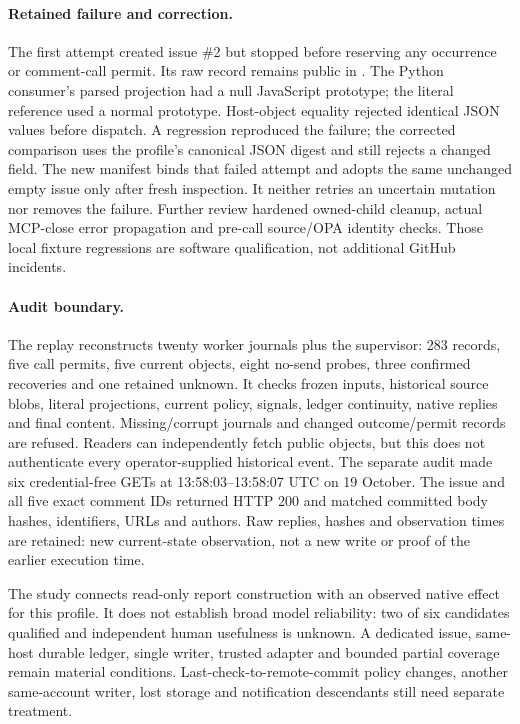 \documentclass[11pt,letterpaper]{article}
\begin{document}
\paragraph{Retained failure and correction.}
The first attempt created issue \#2 but stopped before reserving any occurrence
or comment-call permit. Its raw record remains public in
. The Python consumer's
parsed projection had a null JavaScript prototype; the literal reference used
a normal prototype. Host-object equality rejected identical JSON values before
dispatch. A regression reproduced the failure; the corrected comparison uses
the profile's canonical JSON digest and still rejects a changed field. The new
manifest binds that failed attempt and adopts the same unchanged empty issue
only after fresh inspection. It neither retries an uncertain mutation nor
removes the failure. Further review hardened owned-child cleanup, actual
MCP-close error propagation and pre-call source/OPA identity checks. Those local
fixture regressions are software qualification, not additional GitHub incidents.

\paragraph{Audit boundary.}
The replay 
reconstructs twenty worker journals plus the supervisor: 283 records, five call
permits, five current objects, eight no-send probes, three confirmed recoveries
and one retained unknown. It checks frozen inputs, historical source blobs,
literal projections, current policy, signals, ledger continuity, native replies
and final content. Missing/corrupt journals and changed outcome/permit records
are refused. Readers can independently fetch public objects, but this does not
authenticate every operator-supplied historical event. The separate audit
made six credential-free GETs at 13:58:03--13:58:07 UTC on 19 October. The issue
and all five exact comment IDs returned HTTP 200 and matched committed body
hashes, identifiers, URLs and authors. Raw replies, hashes and observation times
are retained: new current-state observation, not a new write or proof of the
earlier execution time.

The study connects read-only report construction with an observed native effect
for this profile. It does not establish broad model reliability: two of six
candidates qualified and independent human usefulness is unknown. A dedicated
issue, same-host durable ledger, single writer, trusted adapter and bounded
partial coverage remain material conditions. Last-check-to-remote-commit policy
changes, another same-account writer, lost storage and notification descendants
still need separate treatment.
\end{document}

